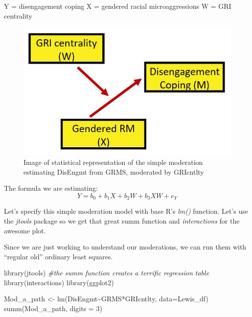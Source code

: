 \documentclass[
  11pt,
]{book}
\newenvironment{Shaded}{\begin{snugshade}}{\end{snugshade}}
\newcommand{\AttributeTok}[1]{\textcolor[rgb]{0.77,0.63,0.00}{#1}}
\newcommand{\CommentTok}[1]{\textcolor[rgb]{0.56,0.35,0.01}{\textit{#1}}}
\newcommand{\DecValTok}[1]{\textcolor[rgb]{0.00,0.00,0.81}{#1}}
\newcommand{\FunctionTok}[1]{\textcolor[rgb]{0.00,0.00,0.00}{#1}}
\newcommand{\NormalTok}[1]{#1}
\newcommand{\OtherTok}[1]{\textcolor[rgb]{0.56,0.35,0.01}{#1}}
\newcommand{\SpecialCharTok}[1]{\textcolor[rgb]{0.00,0.00,0.00}{#1}}
\begin{document}
Y = disengagement coping
X = gendered racial microaggressions
W = GRI centrality

\begin{figure}
\centering
\includegraphics{images/ModMed/LewisMod1.jpg}
\caption{Image of statistical representation of the simple moderation estimating DisEngmt from GRMS, moderated by GRIcntlty}
\end{figure}

The formula we are estimating:
\[Y=b_{0}+b_{1}X+b_{2}W+b_{3}XW+e_{Y}\]

Let's specify this simple moderation model with base R's \emph{lm()} function. Let's use the \emph{jtools} package so we get that great summ function and \emph{interactions} for the awesome plot.

Since we are just working to understand our moderations, we can run them with ``regular old'' ordinary least squares.

\begin{Shaded}
\begin{Highlighting}[]
\FunctionTok{library}\NormalTok{(jtools) }\CommentTok{\#the summ function creates a terrific regression table}
\FunctionTok{library}\NormalTok{(interactions)}
\FunctionTok{library}\NormalTok{(ggplot2)}

\NormalTok{Mod\_a\_path }\OtherTok{\textless{}{-}} \FunctionTok{lm}\NormalTok{(DisEngmt}\SpecialCharTok{\textasciitilde{}}\NormalTok{GRMS}\SpecialCharTok{*}\NormalTok{GRIcntlty, }\AttributeTok{data=}\NormalTok{Lewis\_df)}
\FunctionTok{summ}\NormalTok{(Mod\_a\_path, }\AttributeTok{digits =} \DecValTok{3}\NormalTok{)}
\end{Highlighting}
\end{Shaded}
\end{document}
